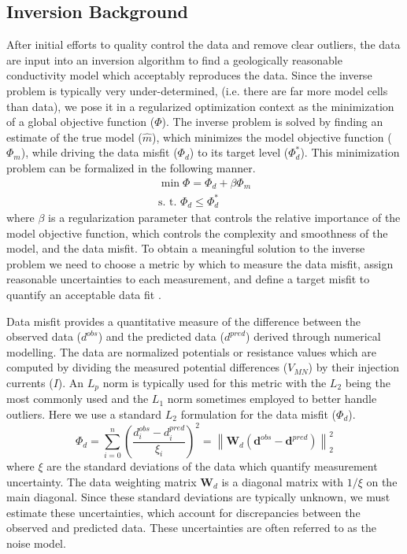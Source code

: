 \documentclass[final,authoryear,5p,times,twocolumn]{elsarticle}
\begin{document}
\subsection{Inversion Background}

After initial efforts to quality control the data and remove clear outliers, the data are input into an inversion algorithm to find a geologically reasonable conductivity model which acceptably reproduces the data. Since the inverse problem is typically very under-determined, (i.e. there are far more model cells than data), we pose it in a regularized optimization context as the minimization of a global objective function ($\Phi$). The inverse problem is solved by finding an estimate of the true model ($\widehat{m}$), which minimizes the model objective function ($\Phi_m$), while driving the data misfit ($\Phi_d$) to its target level ($\Phi_{d}^*$). This minimization problem can be formalized in the following manner.
\begin{eqnarray}
\label{eq:globphi}
\min \Phi = \Phi_d+\beta\Phi_m \\
\mbox{s. t. } \Phi_{d} \leq \Phi_{d}^* \nonumber
\end{eqnarray}
where $\beta$ is a regularization parameter that controls the relative importance of the model objective function, which controls the complexity and smoothness of the model, and the data misfit. To obtain a meaningful solution to the inverse problem we need to choose a metric by which to measure the data misfit, assign reasonable uncertainties to each measurement, and define a target misfit to quantify an acceptable data fit \citep{Oldenburg2005}.

Data misfit provides a quantitative measure of the difference between the observed data ($d^{obs}$) and the predicted data ($d^{pred}$) derived through numerical modelling. The data are normalized potentials or resistance values which are computed by dividing the measured potential differences ($V_{MN}$) by their injection currents ($I$). An $L_p$ norm is typically used for this metric with the $L_2$ being the most commonly used and the $L_1$ norm sometimes employed to better handle outliers. Here we use a standard $L_2$ formulation for the data misfit ($\Phi_d$).
\begin{equation}
\Phi_d = \sum^{n}_{i=0}\left(\frac{d^{obs}_i-d^{pred}_i}{\xi_i}\right)^2 = \left\|\mathbf{W}_{d}\left(\mathbf{d}^{obs}-\mathbf{d}^{pred}\right)\right\|_2^2
\end{equation}
where $\xi$ are the standard deviations of the data which quantify measurement uncertainty. The data weighting matrix $\mathbf{W}_{d}$ is a diagonal matrix with $1/\xi$ on the main diagonal. Since these standard deviations are typically unknown, we must estimate these uncertainties, which account for discrepancies between the observed and predicted data. These uncertainties are often referred to as the noise model.
\end{document}
